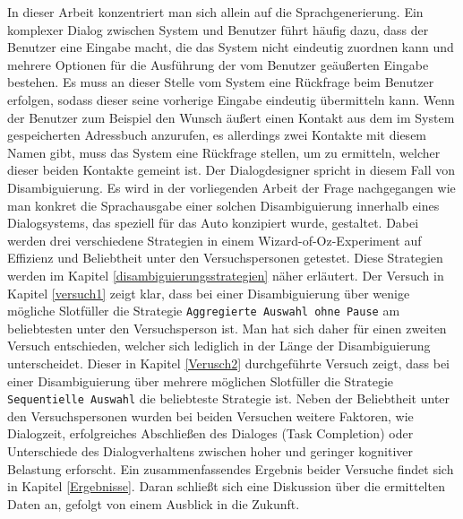 \documentclass[12pt,a4paper]{scrartcl}
\begin{document}
In dieser Arbeit konzentriert man sich allein auf die Sprachgenerierung. Ein komplexer Dialog zwischen System und Benutzer führt häufig dazu, dass der Benutzer eine Eingabe macht, die das System nicht eindeutig zuordnen kann und mehrere Optionen für die Ausführung der vom Benutzer geäußerten Eingabe bestehen. Es muss an dieser Stelle vom System eine Rückfrage beim Benutzer erfolgen, sodass dieser seine vorherige Eingabe eindeutig übermitteln kann. Wenn der Benutzer zum Beispiel den Wunsch äußert einen Kontakt aus dem im System gespeicherten Adressbuch anzurufen, es allerdings zwei Kontakte mit diesem Namen gibt, muss das System eine Rückfrage stellen, um zu ermitteln, welcher dieser beiden Kontakte gemeint ist. Der Dialogdesigner spricht in diesem Fall von Disambiguierung.  Es wird in der vorliegenden Arbeit der Frage nachgegangen wie man konkret die Sprachausgabe einer solchen Disambiguierung innerhalb eines Dialogsystems, das speziell für das Auto konzipiert wurde, gestaltet. Dabei werden drei verschiedene Strategien in einem Wizard-of-Oz-Experiment auf Effizienz und Beliebtheit unter den Versuchspersonen getestet. Diese Strategien werden im Kapitel \ref{disambiguierungsstrategien} näher erläutert. Der Versuch in Kapitel \ref{versuch1} zeigt klar, dass bei einer Disambiguierung über wenige mögliche Slotfüller die Strategie \texttt{Aggregierte Auswahl ohne Pause} am beliebtesten unter den Versuchsperson ist. Man hat sich daher für einen zweiten Versuch entschieden, welcher sich lediglich in der Länge der Disambiguierung unterscheidet. Dieser in Kapitel \ref{Verusch2} durchgeführte Versuch zeigt, dass bei einer Disambiguierung über mehrere möglichen Slotfüller die Strategie \texttt{Sequentielle Auswahl} die beliebteste Strategie ist. Neben der Beliebtheit unter den Versuchspersonen wurden bei beiden Versuchen weitere Faktoren, wie Dialogzeit, erfolgreiches Abschließen des Dialoges (Task Completion) oder Unterschiede des Dialogverhaltens zwischen hoher und geringer kognitiver Belastung erforscht. Ein zusammenfassendes Ergebnis beider Versuche findet sich in Kapitel \ref{Ergebnisse}. Daran schließt sich eine Diskussion über die ermittelten Daten an, gefolgt von einem Ausblick in die Zukunft. 

\end{document}
